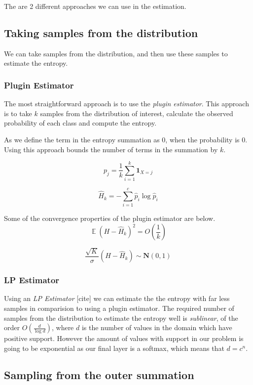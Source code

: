 \documentclass[12pt, a4paper]{report}
\theoremstyle{definition}
\DeclareMathOperator{\E}{\mathbb{E}}
\begin{document}
The are 2 different approaches we can use in the estimation.

\subsection{Taking samples from the distribution}

We can take samples from the distribution, and then use these samples to estimate the entropy.



\subsubsection{Plugin Estimator}
The most straightforward approach is to use the \textit{plugin estimator}. This approach is to take $k$ samples from the distribution of interest, calculate the observed probability of each class and compute the entropy.

As we define the term in the entropy summation as $0$, when the probability is $0$. Using this approach bounds the number of terms in the summation by $k$.

$$p_j = \frac{1}{k} \sum_{i=1}^k \mathbf{1}_{X = j} $$

$$\hat{H}_k = - \sum_{i=1}^{c} \hat{p}_i \log{\hat{p}_i}$$


Some of the convergence properties of the plugin estimator are below.
$$\E \left(H - \hat{H}_k \right)^2 = O \left ( \frac{1}{k} \right) $$

$$ \frac{\sqrt{K}}{\sigma} \left(H - \hat{H}_k \right) \sim \mathbf{N} \left(0, 1 \right) $$



\subsubsection{LP Estimator}

Using an \textit{LP Estimator} [cite] we can estimate the the entropy with far less samples in comparision to using a plugin estimator. The required number of samples from the distribution to estimate the entropy well is \textit{sublinear}, of the order $O \left( \frac{d}{\log{d}}\right)$, where $d$ is the number of values in the domain which have positive support. However the amount of values with support in our problem is going to be exponential as our final layer is a softmax, which means that $d = c^n$.


\subsection{Sampling from the outer summation}
\end{document}
